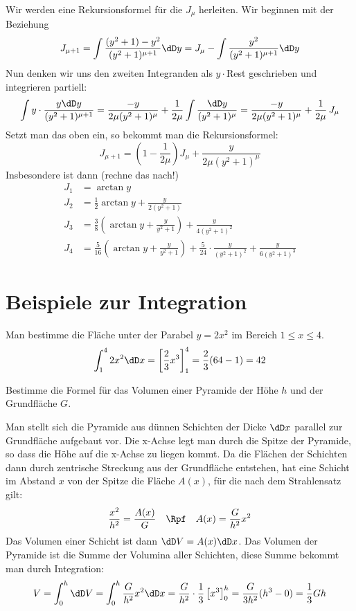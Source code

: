 Wir werden eine Rekursionsformel für die $J_\mu$ herleiten. Wir beginnen mit
der Beziehung
\[
J_{\mu+1}=\int\frac{(y^2+1)-y^2}{(y^2+1)^{\mu+1}}\dD y
=J_\mu-\int\frac{y^2}{(y^2+1)^{\mu+1}}\dD y
\]
Nun denken wir uns den zweiten Integranden als $y\cdot$Rest geschrieben und
integrieren partiell:
\[
\int y\cdot\frac{y\dD y}{(y^2+1)^{\mu+1}}=
\frac{-y}{2\mu(y^2+1)^\mu}+\frac{1}{2\mu}\int\frac{\dD y}{(y^2+1)^\mu}=
\frac{-y}{2\mu(y^2+1)^\mu}+\frac{1}{2\mu}\,J_\mu
\]
Setzt man das oben ein, so bekommt man die Rekursionsformel:
\begin{equation}
  \label{eq:71}
  J_{\mu+1}=\left(1-\frac{1}{2\mu}\right)J_\mu+\frac{y}{2\mu(y^2+1)^\mu}
\end{equation}
Insbesondere ist dann (rechne das nach!)
\begin{align*}
  J_1&=\arctan y\\
  J_2&=\frac{1}{2}\arctan y+\frac{y}{2(y^2+1)}\\
  J_3&=\frac38\left(\arctan y+\frac{y}{y^2+1}\right)+\frac{y}{4(y^2+1)^2}\\
  J_4&=\frac{5}{16}\left(\arctan y+\frac{y}{y^2+1}\right)+
       \frac{5}{24}\cdot\frac{y}{(y^2+1)^2}+\frac{y}{6(y^2+1)^3}
\end{align*}

\section{Beispiele zur Integration}
\NA Man bestimme die Fläche unter der Parabel $y=2x^2$ im Bereich $1\le x\le
4$.
\[
\int_1^4 2x^2\dD x=\left[\frac{2}{3}x^3\right]_1^4=\frac{2}{3}(64-1)=42
\]

\NA Bestimme die Formel für das Volumen einer Pyramide der Höhe $h$ und der
Grundfläche $G$.

Man stellt sich die Pyramide aus dünnen Schichten der Dicke $\dD x$ parallel
zur Grundfläche aufgebaut vor. Die x-Achse legt man durch die Spitze der
Pyramide, so dass die Höhe auf die x-Achse zu liegen kommt. Da die Flächen der
Schichten dann durch zentrische Streckung aus der Grundfläche entstehen, hat
eine Schicht im Abstand $x$ von der Spitze die Fläche $A(x)$, für die nach dem
Strahlensatz gilt:
\[
\frac{x^2}{h^2}=\frac{A(x)}{G}\quad\Rpf\quad A(x)=\frac{G}{h^2} x^2
\]
Das Volumen einer Schicht ist dann $\dD V=A(x)\dD x$. Das Volumen der Pyramide
ist die Summe der Volumina aller Schichten, diese Summe bekommt man durch
Integration:
\[
V=\int_0^h \dD V=\int_0^h \frac{G}{h^2}x^2\dD x
=\frac{G}{h^2}\cdot\frac{1}{3}\left[x^3\right]_0^h=
\frac{G}{3h^2}(h^3-0)=\frac{1}{3}Gh
\]

